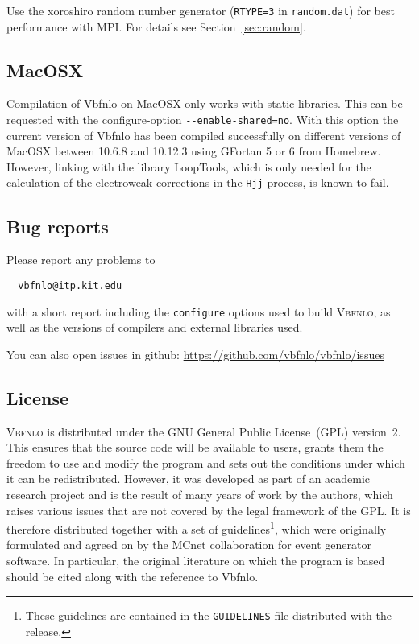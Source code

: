 \documentclass[english,12pt]{article}
\begin{document}
Use the xoroshiro random number generator ({\tt RTYPE=3} in {\tt random.dat}) for best
performance with MPI. For details see Section~\ref{sec:random}.

\subsection{MacOSX}

Compilation of {\sc Vbfnlo} on MacOSX only works with static libraries.
This can be requested with the configure-option {\tt -{}-enable-shared=no}.
With this option the current version of {\sc Vbfnlo} has been compiled successfully 
on different versions of MacOSX  between 10.6.8 and 10.12.3
using GFortan 5 or 6 from Homebrew.
However, linking with the library {\sc LoopTools}, which is only
needed for the calculation of the electroweak corrections in the {\tt Hjj}
process, is known to fail.



\subsection{Bug reports}

Please report any problems to
\begin{verbatim}
  vbfnlo@itp.kit.edu
\end{verbatim}
with a short report including the {\tt configure} options used to build
\textsc{Vbfnlo}, as well as the versions of compilers and external libraries
used.

You can also open issues in github: \url{https://github.com/vbfnlo/vbfnlo/issues}

\subsection{License}

\textsc{Vbfnlo} is distributed under the GNU General Public License~(GPL)
version~2. This ensures that the source code will be available to users,
grants them the freedom to use and modify the program and sets
out the conditions under which it can be redistributed. However, it was
developed as part of an academic research project and is the result of
many years of work by the authors, which raises various issues that are
not covered by the legal framework of the GPL. It is therefore
distributed together with a set of guidelines\footnote{These guidelines
are contained in the \texttt{GUIDELINES} file distributed with the
release.}, which were originally formulated and agreed on by the
MCnet collaboration for event generator software.
In particular, the original literature on which the program is based
should be cited along with the reference to {\sc Vbfnlo}.
\end{document}
